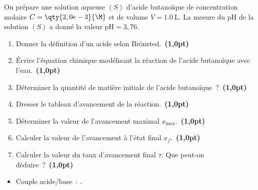 On prépare une solution aqueuse $(S)$ d'acide butanoïque  de
concentration molaire $C=\qty{2,0e-3}{\M}$ et de volume $V=\qty{1,0}{\liter}$.
La mesure du pH de la solution $(S)$ a donné la valeur
$\mathrm{pH}=3,76$.
\begin{enumerate}
    \item Donner la définition d'un acide selon Brönsted.~\textbf{(1,0pt)}
    \item Écrire l'équation chimique modélisant la réaction de l'acide
          butanoïque avec l'eau.~\textbf{(1,0pt)}
    \item Déterminer la quantité de matière initiale de l'acide
          butanoïque~?~\textbf{(1,0pt)}
    \item Dresser le tableau d'avancement de la réaction.~\textbf{(1,0pt)}
    \item Déterminer la valeur de l'avancement maximal
          $x_{\max}$.~\textbf{(1,0pt)}
    \item Calculer la valeur de l'avancement à l'état final
          $x_{f}$.~\textbf{(1,0pt)}
    \item Calculer la valeur du taux d'avancement final $\tau$. Que peut-on
          déduire~?~\textbf{(1,0pt)}
\end{enumerate}

\begin{donnees}
    \begin{itemize}
    \item Couple acide/base~: .
\end{itemize}
\end{donnees}
